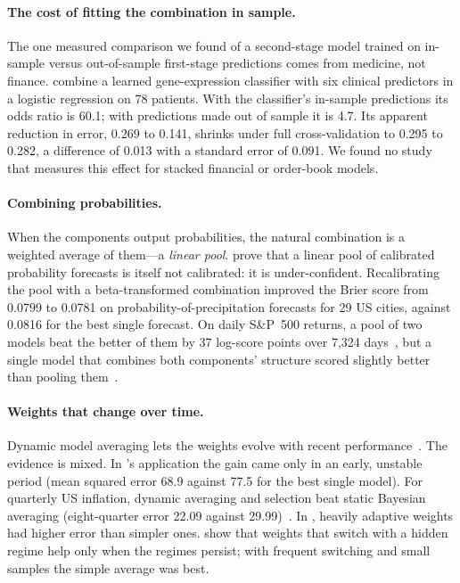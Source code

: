 \paragraph{The cost of fitting the combination in sample.} The one measured comparison we found of a
second-stage model trained on in-sample versus out-of-sample first-stage predictions comes from medicine,
not finance. \citet{tibshirani2002preval} combine a learned gene-expression classifier with six clinical
predictors in a logistic regression on 78 patients. With the classifier's in-sample predictions its odds
ratio is 60.1; with predictions made out of sample it is 4.7. Its apparent reduction in error, 0.269 to
0.141, shrinks under full cross-validation to 0.295 to 0.282, a difference of 0.013 with a standard error of
0.091. We found no study that measures this effect for stacked financial or order-book models.

\paragraph{Combining probabilities.} When the components output probabilities, the natural combination is
a weighted average of them---a \emph{linear pool}. \citet{ranjan2010} prove that a linear pool of calibrated
probability forecasts is itself not calibrated: it is under-confident. Recalibrating the pool with a
beta-transformed combination improved the Brier score from 0.0799 to 0.0781 on probability-of-precipitation forecasts for 29 US cities, against
0.0816 for the best single forecast. On daily S\&P~500 returns, a pool of two models beat the better of
them by 37 log-score points over 7{,}324 days~\citep{geweke2011}, but a single model that combines both
components' structure scored slightly better than pooling them~\citep{gneiting2013combining}.

\paragraph{Weights that change over time.} Dynamic model averaging lets the weights evolve with recent
performance~\citep{raftery2010dma}. The evidence is mixed. In \citeauthor{raftery2010dma}'s application the
gain came only in an early, unstable period (mean squared error 68.9 against 77.5 for the best single
model). For quarterly US inflation, dynamic averaging and selection beat static Bayesian averaging
(eight-quarter error 22.09 against 29.99)~\citep{koop2012dma}. In \citet{stockwatson2004}, heavily adaptive
weights had higher error than simpler ones. \citet{elliott2005} show that weights that switch with a hidden regime help only
when the regimes persist; with frequent switching and small samples the simple average was best.

